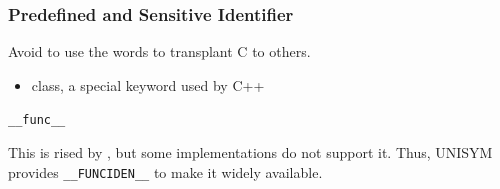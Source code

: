 

\subsubsection{Predefined and Sensitive Identifier}

Avoid to use the words to transplant C to others.

\begin{itemize}

\item class, a special keyword used by C++
\end{itemize}

\texttt{\_\_func\_\_}

This is rised by \cite{StdC99}, but some implementations do not support it. Thus, UNISYM provides \texttt{\_\_FUNCIDEN\_\_} to make it widely available.


